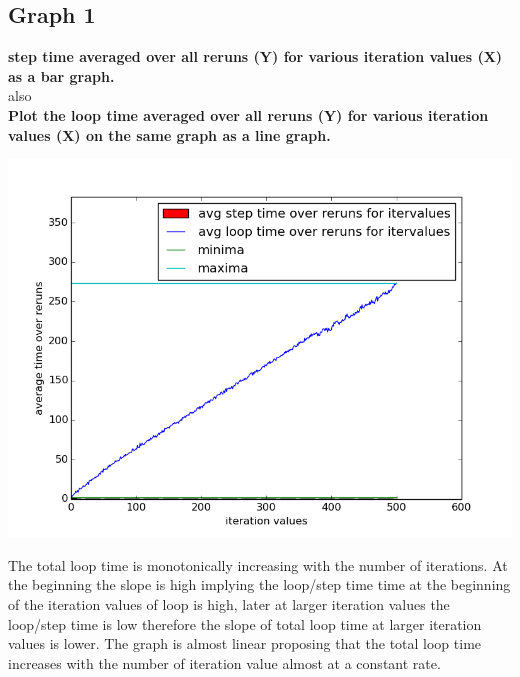 \documentclass[11pt]{article}
\begin{document}
\subsection{Graph 1}
\textbf{step time averaged over all reruns (Y) for various iteration values (X) as a bar graph.}\\
also\\
\textbf{Plot the loop time averaged over all reruns (Y) for various iteration values (X) on the same graph as a line graph.}
\begin{center}
		\includegraphics[scale=0.4]{g10_project_plot01}
\end{center}
The total loop time is monotonically increasing with the number of iterations. At the beginning the slope is high implying the loop/step time time at the beginning of the iteration values of loop is high, later at larger iteration values the loop/step time is low therefore the slope of total loop time at larger iteration values is lower. The graph is almost linear proposing that the total loop time increases with the number of iteration value almost at a constant rate.
\end{document}
